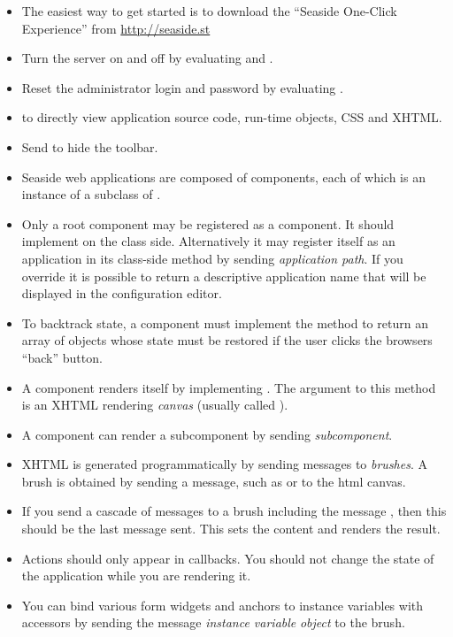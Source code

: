 \documentclass[a4paper,10pt,twoside]{book}
\begin{document}
\begin{itemize}
  \item The easiest way to get started is to download the ``Seaside One-Click Experience'' from \url{http://seaside.st}
  \item Turn the server on and off by evaluating  and .
  \item Reset the administrator login and password by evaluating .
  \item {} to directly view application source code, run-time objects, CSS and XHTML.
  \item Send  to hide the toolbar.
  \item Seaside web applications are composed of components, each of which is an instance of a subclass of .
  \item Only a root component may be registered as a component. It should implement  on the class side. Alternatively it may register itself as an application in its class-side  method by sending  \emph{application path}.
  If you override  it is possible to return a descriptive application name that will be displayed in the configuration editor.
  \item To backtrack state, a component must implement the  method to return an array of objects whose state must be restored if the user clicks the browsers ``back'' button.
  \item A component renders itself by implementing .
  The argument to this method is an XHTML rendering \emph{canvas} (usually called ).
  \item A component can render a subcomponent by sending  \emph{subcomponent}.
  \item XHTML is generated programmatically by sending messages to \emph{brushes}. A brush is obtained by sending a message, such as  or  to the html canvas.
  \item If you send a cascade of messages to a brush including the message , then this should be the last message sent.
  This sets the content and renders the result.
  \item Actions should only appear in callbacks.
You should not change the state of the application while you are rendering it.
  \item You can bind various form widgets and anchors to instance variables with accessors by sending the message  \emph{instance variable}  \emph{object} to the brush.

\end{itemize}
\end{document}
